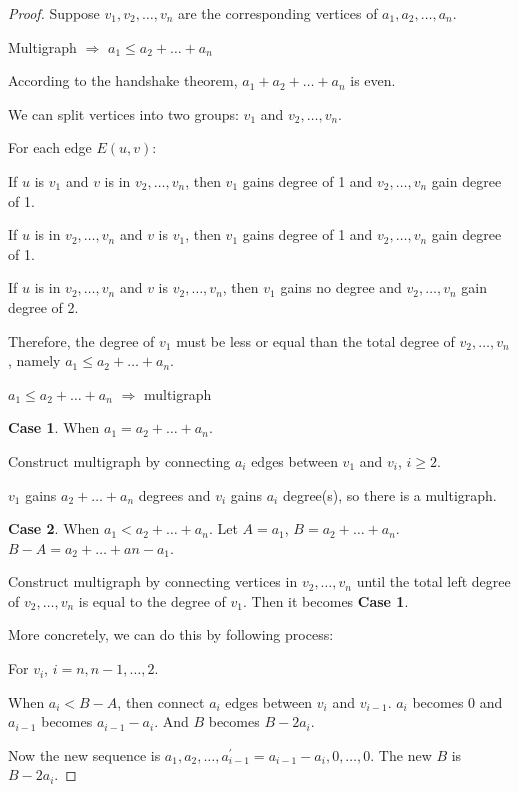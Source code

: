 \begin{proof}
Suppose $v_1, v_2 , \dots, v_n$ are the corresponding vertices of $a_1, a_2, \dots, a_n$.

Multigraph $ \Rightarrow $ $a_1 \leq a_2 + \dots + a_n$

According to the handshake theorem, $a_1 + a_2 + \dots + a_n$ is even.

We can split vertices into two groups: $v_1$ and $v_2, \dots, v_n$.

    For each edge $E(u,v)$:

    If $u$ is $v_1$ and $v$ is in $v_2, \dots, v_n$, then $v_1$ gains degree of 1 and $v_2, \dots, v_n$ gain degree of 1.

    If $u$ is in $v_2, \dots, v_n$ and $v$ is $v_1$, then $v_1$ gains degree of 1 and $v_2, \dots, v_n$ gain degree of 1.

    If $u$ is in $v_2, \dots, v_n$ and $v$ is $v_2, \dots, v_n$, then $v_1$ gains no degree and $v_2, \dots, v_n$ gain degree of 2.

    Therefore, the degree of $v_1$ must be less or equal than the total degree of $v_2, \dots, v_n$, namely $a_1 \leq a_2 + \dots + a_n$.


$a_1 \leq a_2 + \dots + a_n$ $ \Rightarrow $ multigraph

    \textbf{Case 1}. When $a_1 = a_2 + \dots + a_n$.

    Construct multigraph by connecting $a_i$ edges between $v_1$ and $v_i$, $i \geq 2$.

    $v_1$ gains $a_2 + \dots + a_n$ degrees and $v_i$ gains $a_i$ degree(s), so there is a multigraph.

    \textbf{Case 2}. When $a_1 < a_2 + \dots + a_n$.
    Let $A = a_1$, $B = a_2 + \dots + a_n$. $B - A = a_2 + \dots + an - a_1$.

    Construct multigraph by connecting vertices in $v_2, \dots, v_n$ until the total left degree of $v_2, \dots , v_n$ is equal to the degree of $v_1$. Then it becomes \textbf{Case 1}.

    More concretely, we can do this by following process:

    For $v_i$, $i=n, n-1, \dots, 2$.

    When $a_i < B - A$, then connect $a_i$ edges between $v_i$ and $v_{i-1}$. $a_i$ becomes 0 and $a_{i-1}$ becomes $a_{i-1} - a_i$. And $B$ becomes $B - 2 a_i$.

    Now the new sequence is $a_1, a_2, \dots, a_{i-1}^\prime = a_{i-1} - a_i, 0, \dots, 0$. The new $B$ is $B - 2 a_i$.


\end{proof}

